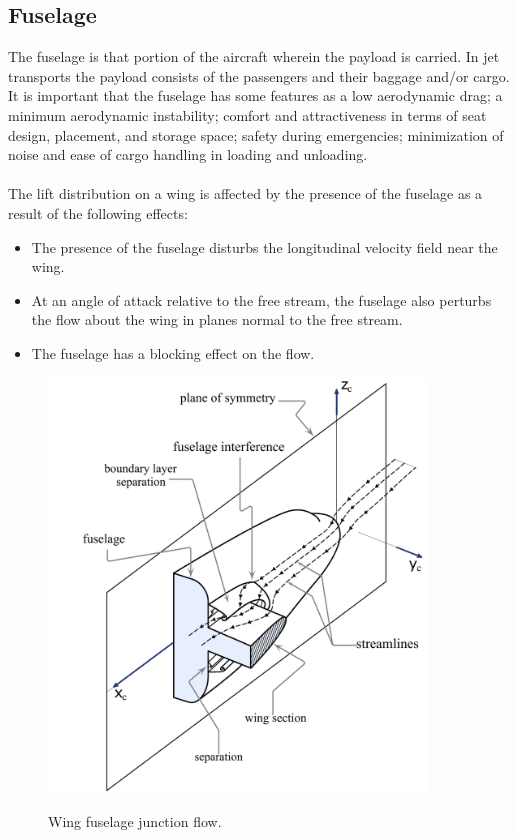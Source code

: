 \subsection{Fuselage}

The fuselage is that portion of the aircraft wherein the payload is carried. In jet transports the payload consists of the passengers and their baggage and/or cargo. It is important that the fuselage has some features as a low aerodynamic drag; a minimum aerodynamic instability;  comfort and attractiveness in terms of seat design, placement, and storage space; safety during emergencies; minimization of noise and ease of cargo handling in loading and unloading.\cite{sforza2014commercial} \\ \\ 


The lift distribution on a wing is affected by the presence of the fuselage as a result of the following effects:
\begin{itemize}
\item The presence of the fuselage disturbs the longitudinal velocity field near the wing.
\item At an angle of attack relative to the free stream, the fuselage also perturbs the flow about the wing in planes normal to the free stream.
\item The fuselage has a blocking effect on the flow.
\end{itemize}

\begin{figure}[H]
\centering
{\includegraphics[height=11cm]{Immagini/wf}} 
\label{wf}
\caption{Wing fuselage junction flow.}
\end{figure} 		



